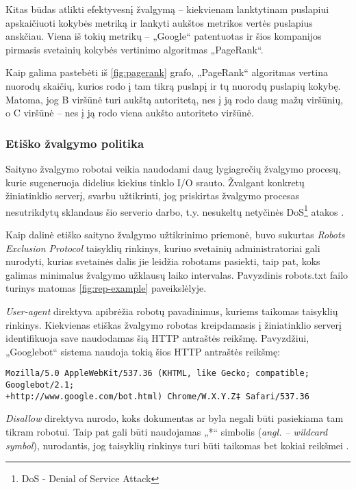Kitas būdas atlikti efektyvesnį žvalgymą -- kiekvienam lanktytinam puslapiui apskaičiuoti kokybės metriką ir lankyti aukštos metrikos vertės puslapius anskčiau. Viena iš tokių metrikų -- „Google“ patentuotas ir šios kompanijos pirmasis svetainių kokybės vertinimo algoritmas „PageRank“.



Kaip galima pastebėti iš \ref{fig:pagerank} grafo, „PageRank“ algoritmas vertina nuorodų skaičių, kurios rodo į tam tikrą puslapį ir tų nuorodų puslapių kokybę. Matoma, jog B viršūnė turi aukštą autoritetą, nes į ją rodo daug mažų viršūnių, o C viršūnė -- nes į ją rodo viena aukšto autoriteto viršūnė.

\subsubsection{Etiško žvalgymo politika}

Saityno žvalgymo robotai veikia naudodami daug lygiagrečių žvalgymo procesų, kurie sugeneruoja didelius kiekius tinklo I/O srauto. Žvalgant konkretų žiniatinklio serverį, svarbu užtikrinti, jog priskirtas žvalgymo procesas nesutrikdytų sklandaus šio serverio darbo, t.y. nesukeltų netyčinės DoS\footnote{DoS - Denial of Service Attack} atakos \cite{EffectiveWebCrawling}. 


Kaip dalinė etiško saityno žvalgymo užtikrinimo priemonė, buvo sukurtas \textit{Robots Exclusion Protocol} taisyklių rinkinys, kuriuo svetainių administratoriai gali nurodyti, kurias svetainės dalis jie leidžia robotams pasiekti, taip pat, koks galimas minimalus žvalgymo užklausų laiko intervalas. Pavyzdinis robots.txt failo turinys matomas \ref{fig:rep-example} paveikslėlyje.



\textit{User-agent} direktyva apibrėžia robotų pavadinimus, kuriems taikomas taisyklių rinkinys. Kiekvienas etiškas žvalgymo robotas kreipdamasis į žiniatinklio serverį identifikuoja save naudodamas šią HTTP antraštės reikšmę. Pavyzdžiui, „Googlebot“ sistema naudoja tokią šios HTTP antraštės reikšmę:
\begin{verbatim}
Mozilla/5.0 AppleWebKit/537.36 (KHTML, like Gecko; compatible; Googlebot/2.1; 
+http://www.google.com/bot.html) Chrome/W.X.Y.Z‡ Safari/537.36
\end{verbatim}
\textit{Disallow} direktyva nurodo, koks dokumentas ar byla negali būti pasiekiama tam tikram robotui. Taip pat gali būti naudojamas „*“ simbolis (\textit{angl. -- wildcard symbol}), nurodantis, jog taisyklių rinkinys turi būti taikomas bet kokiai reikšmei \cite{RobotsExclusionProtocol}.

